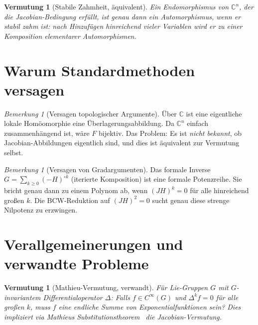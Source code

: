 \documentclass[12pt,a4paper]{amsart}
\newtheorem{vermutung}[theorem]{Vermutung}
\theoremstyle{definition}
\theoremstyle{remark}
\newtheorem{bemerkung}[theorem]{Bemerkung}
\begin{document}
\begin{vermutung}[Stabile Zahmheit, äquivalent]\label{verm:stabile_zahmheit}
Ein Endomorphismus von $\mathbb{C}^n$, der die Jacobian-Bedingung erfüllt, ist genau
dann ein Automorphismus, wenn er \emph{stabil zahm} ist: nach Hinzufügen hinreichend
vieler Variablen wird er zu einer Komposition elementarer Automorphismen.
\end{vermutung}

\section{Warum Standardmethoden versagen}

\begin{bemerkung}[Versagen topologischer Argumente]
Über $\mathbb{C}$ ist eine eigentliche lokale Homöomorphie eine Überlagerungsabbildung.
Da $\mathbb{C}^n$ einfach zusammenhängend ist, wäre $F$ bijektiv. Das Problem: Es
ist \emph{nicht bekannt}, ob Jacobian-Abbildungen eigentlich sind, und dies ist
äquivalent zur Vermutung selbst.
\end{bemerkung}

\begin{bemerkung}[Versagen von Gradargumenten]
Das formale Inverse $G = \sum_{k \geq 0} (-H)^{\circ k}$ (iterierte Komposition)
ist eine formale Potenzreihe. Sie bricht genau dann zu einem Polynom ab, wenn
$(JH)^k = 0$ für alle hinreichend großen $k$. Die BCW-Reduktion auf $(JH)^2 = 0$
sucht genau diese strenge Nilpotenz zu erzwingen.
\end{bemerkung}

\section{Verallgemeinerungen und verwandte Probleme}

\begin{vermutung}[Mathieu-Vermutung, verwandt]\label{verm:mathieu}
Für Lie-Gruppen $G$ mit $G$-invariantem Differentialoperator $\Delta$: Falls
$f \in C^\infty(G)$ und $\Delta^k f = 0$ für alle großen $k$, muss $f$ eine
endliche Summe von Exponentialfunktionen sein? Dies impliziert via
Mathieus Substitutionstheorem~\cite{Math97} die Jacobian-Vermutung.
\end{vermutung}
\end{document}
